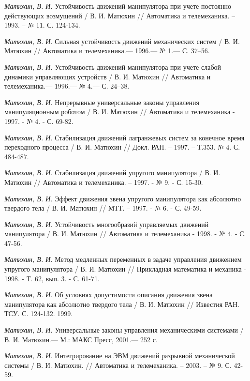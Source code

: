 \begin{thebibliography}{10}
	{\it Матюхин, В. И.} Устойчивость движений манипулятора при учете постоянно действующих возмущений / В. И. Матюхин // Автоматика и телемеханика. -- 1993. -- № 11. С. 124-134.
	
	{\it Матюхин, В. И.} Сильная устойчивость движений механических систем
	/ В. И. Матюхин // Автоматика и телемеханика.— 1996.— № 1.— С. 37–56.
	
	{\it Матюхин, В. И.} Устойчивость движений манипулятора при учете слабой динамики управляющих устройств / В. И. Матюхин // Автоматика и телемеханика.— 1996.— № 4.— С. 24–38.
	
	{\it Матюхин, В. И.} Непрерывные универсальные законы управления манипуляционным роботом
	/ В. И. Матюхин // Автоматика и телемеханика - 1997. - № 4. - С. 69-82.
	
	{\it Матюхин, В. И.} Стабилизация движений лагранжевых систем за конечное время переходного процесса / В. И. Матюхин // Докл. РАН. -- 1997. -- Т.353. № 4. С. 484-487.
	
	{\it Матюхин, В. И.} Стабилизация движений упругого манипулятора / В. И. Матюхин // Автоматика и телемеханика. -- 1997. - № 9. - С. 15-30.
	
	{\it Матюхин, В. И.} Эффект движения звена упругого манипулятора как абсолютно твердого тела / В. И. Матюхин // МТТ. -- 1997. - № 6. - С. 49-59.
	
	{\it Матюхин, В. И.} Устойчивость многообразий управляемых движений манипулятора
	/ В. И. Матюхин // Автоматика и телемеханика - 1998. - № 4. - С. 47-56.
	
	{\it Матюхин, В. И.} Метод медленных переменных в задаче управления движением упругого манипулятора
	/ В. И. Матюхин // Прикладная математика и механика - 1998. - Т. 62, вып. 3. - С. 61-71.
	
	{\it Матюхин, В. И.} Об условиях допустимости описания движения звена манипулятора как абсолютно твердого тела
	/ В. И. Матюхин // Известия РАН. ТСУ. С. 124-132. 1999.
	
	{\it Матюхин, В. И.} Универсальные законы управления механическими системами /
	В. И. Матюхин.— М.: МАКС Пресс, 2001.— 252 с.

	{\it Матюхин, В. И.} Интегрирование на ЭВМ движений разрывной механической системы /
	В. И. Матюхин. // Автоматика и телемеханика. -- 2003. -- № 9. С. 42-59.


\end{thebibliography}
